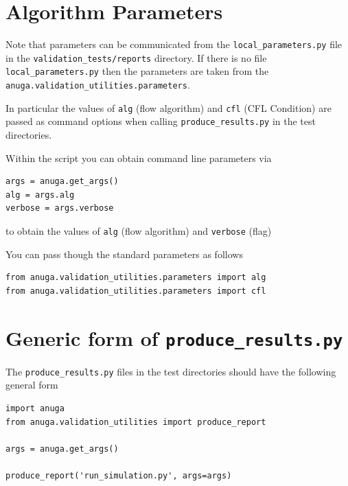 \section{Algorithm Parameters}
Note that parameters can be communicated from the \verb|local_parameters.py|
file in the \verb|validation_tests/reports| directory. If there is no file
\verb|local_parameters.py| then the parameters are taken from the
\verb|anuga.validation_utilities.parameters|.

In particular the
values of \verb|alg| (flow algorithm) and \verb|cfl| (CFL Condition)
are passed as command options when calling \verb|produce_results.py| in the
test directories.

Within the \anuga{} script you can obtain command line parameters via
\begin{verbatim}
args = anuga.get_args()
alg = args.alg
verbose = args.verbose
\end{verbatim}
to obtain the values of \verb|alg| (flow algorithm) and \verb|verbose| (flag)

You can pass though the standard parameters as follows
\begin{verbatim}
from anuga.validation_utilities.parameters import alg
from anuga.validation_utilities.parameters import cfl
\end{verbatim}

\pagebreak
\section{Generic form of \texttt{produce\_results.py}}

The \texttt{produce\_results.py} files in the test directories should have the
following general form

\begin{verbatim}
import anuga
from anuga.validation_utilities import produce_report

args = anuga.get_args()

produce_report('run_simulation.py', args=args)
\end{verbatim}
